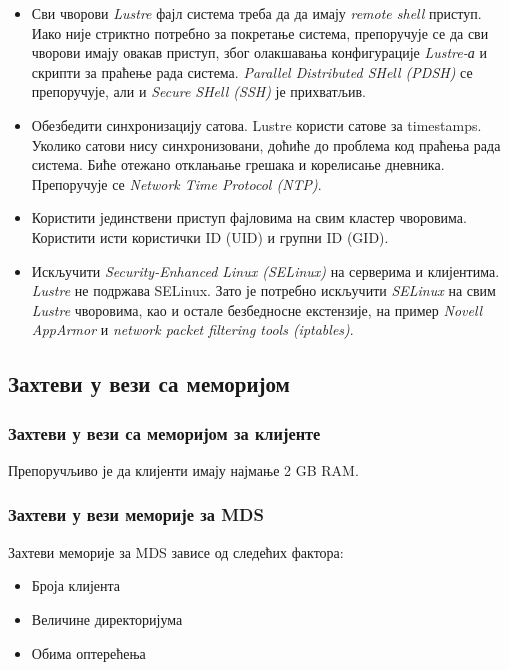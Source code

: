\begin{itemize}
\item Сви чворови   \textit{Lustre} фајл система треба да да имају \textit{remote shell} приступ. Иако није стриктно потребно за покретање система, препоручује се да сви чворови имају овакав приступ, због олакшавања конфигурације \textit{Lustre-а} и скрипти за праћење рада система. \textit{Parallel Distributed SHell (\gls{PDSH})} се препоручује, али и \textit{Secure SHell (SSH)} је прихватљив.

\item Обезбедити синхронизацију сатова. Lustre користи сатове за timestamps. Уколико сатови нису синхронизовани, доћиће до проблема код праћења рада система. Биће отежано отклањање грешака  и корелисање дневника. Препоручује се  \textit{Network Time Protocol (\gls{NTP})}.

\item Користити јединствени приступ фајловима на свим кластер чворовима. Користити исти користички ID (UID) и групни ID (GID). 

\item Искључити  \textit{Security-Enhanced Linux (\gls{SELinux})} на серверима и клијентима.   \textit{Lustre}  не подржава SELinux. Зато је потребно искључити \textit{SELinux} на свим   \textit{Lustre} чворовима, као и остале безбедносне екстензије, на пример \textit{Novell AppArmor} и \textit{network packet filtering tools (iptables)}.
\end{itemize}

\subsection{Захтеви у вези са меморијом} 

\subsubsection{Захтеви у вези са меморијом за клијенте}

Препоручљиво је да клијенти имају најмање 2 GB RAM.

\subsubsection{Захтеви у вези меморије за MDS}

Захтеви меморије за MDS зависе од следећих фактора:

\begin{itemize}

\item Броја клијента

\item Величине директоријума

\item Обима оптерећења
\end{itemize}

